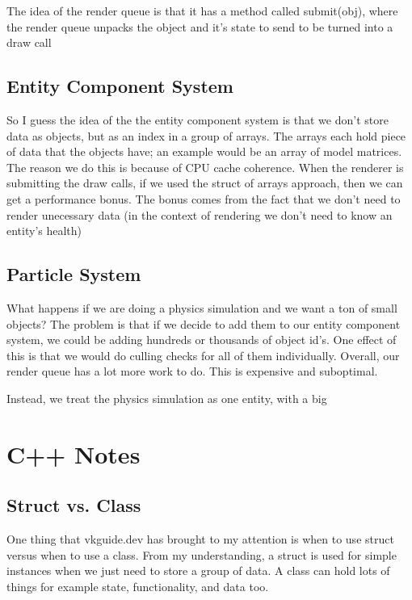 \documentclass{article}
\begin{document}
The idea of the render queue is that it has a method called
submit(obj), where the render queue unpacks the object and it's state
to send to be turned into a draw call

\subsection*{Entity Component
System}
\par So I guess the idea of the the entity component system is that
we don't store data as objects, but as an index in a group of arrays.
The arrays each hold piece of data that the objects have; an example
would be an array of model matrices. The reason we do this is because
of CPU cache coherence. When the renderer is submitting the draw
calls, if we used the struct of arrays approach, then we can get a
performance bonus. The bonus comes from the fact that we don't need
to render unecessary data (in the context of rendering we don't need
to know an entity's health)

\subsection*{Particle System}
\par What happens if we are doing a physics simulation and we want a
ton of small objects? The problem is that if we decide to add them to
our entity component system, we could be adding hundreds or thousands
of object id's. One effect of this is that we would do culling checks
for all of them individually. Overall, our render queue has
a lot more work to do. This is expensive and suboptimal.

\par Instead, we treat the physics simulation as one entity, with a big


\clearpage

\section*{C++ Notes}

\subsection*{Struct vs. Class}
\par One thing that vkguide.dev has brought to my attention is when
to use struct versus when to use a class. From my understanding, a
struct is used for simple instances when we just need to store a
group of data. A class can hold lots of things for example state,
functionality, and data too.
\end{document}
